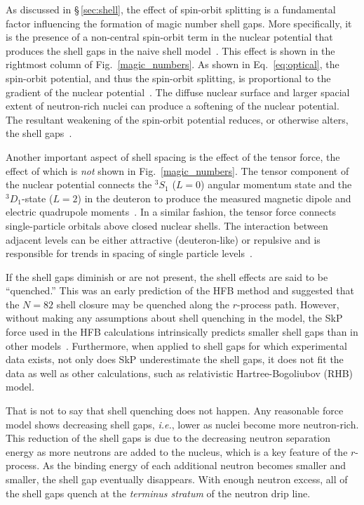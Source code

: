As discussed in \S\,\ref{sec:shell}, the effect of spin-orbit splitting is a fundamental factor influencing the formation of magic number shell gaps.   More specifically, it is the presence of a non-central spin-orbit term in the nuclear potential that produces the shell gaps in the naive shell model~\cite{Krane_1988}.   This effect is shown in the rightmost column of Fig.~\ref{magic_numbers}.  As shown in Eq.~\ref{eq:optical}, the spin-orbit potential, and thus the spin-orbit splitting, is proportional to the gradient of the nuclear potential~\cite{Grawe_2005}.  The diffuse nuclear surface and larger spacial extent of neutron-rich nuclei can produce a softening of the nuclear potential.  The resultant weakening of the spin-orbit potential reduces, or otherwise alters, the shell gaps~\cite{Schiffer_2004}.

Another important aspect of shell spacing is the effect of the tensor force, the effect of which is \textit{not} shown in Fig.~\ref{magic_numbers}.  The tensor component of the nuclear potential connects the $^3S_1$ ($L=0$) angular momentum state and the $^3D_1$-state ($L=2$) in the deuteron to produce the measured magnetic dipole and electric quadrupole moments~\cite{Wong_1998}.  In a similar fashion, the tensor force connects single-particle orbitals above closed nuclear shells.  The interaction between adjacent levels can be either attractive (deuteron-like) or repulsive and is responsible for trends in spacing of single particle levels~\cite{Otsuka_2005}.%

If the shell gaps diminish or are not present, the shell effects are said to be ``quenched.''  This was an early prediction of the HFB method and suggested that the $N=82$ shell closure may be quenched along the $r$-process path.   However, without making any assumptions about shell quenching in the model, the SkP force used in the HFB calculations intrinsically predicts smaller shell gaps than in other models~\cite{Sharma_2002}.  Furthermore, when applied to shell gaps for which experimental data exists, not only does SkP underestimate the shell gaps, it does not fit the data as well as other calculations, such as relativistic Hartree-Bogoliubov (RHB) model. 

That is not to say that shell quenching does not happen.  Any reasonable force model shows decreasing shell gaps, \textit{i.e.}, lower  as nuclei become more neutron-rich.  This reduction of the shell gaps is due to the decreasing neutron separation energy as more neutrons are added to the nucleus, which is a key feature of the $r$-process.  As the binding energy of each additional neutron becomes smaller and smaller, the shell gap eventually disappears.  With enough neutron excess, all of the shell gaps quench at the \textit{terminus stratum} of the neutron drip line.

